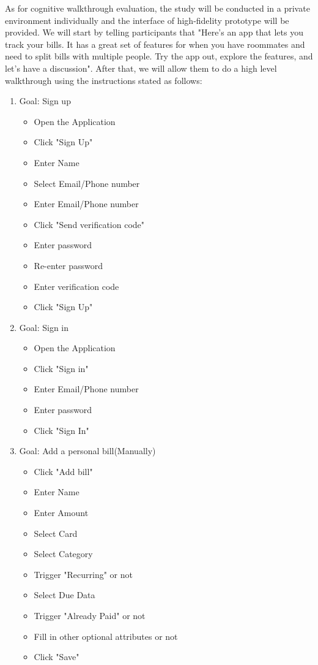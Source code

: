 \documentclass{sigchi}
\begin{document}
As for cognitive walkthrough evaluation, the study will be conducted in a private environment individually and the interface of  high-fidelity prototype will be provided. We will start by telling participants that "Here's an app that lets you track your bills. It has a great set of features for when you have roommates and need to split bills with multiple people. Try the app out, explore the features, and let's have a discussion". After that, we will allow them to do a high level walkthrough using the instructions stated as follows:
\begin{enumerate}
\item Goal: Sign up
    \begin{itemize}
        \item Open the Application
        \item Click "Sign Up"
        \item Enter Name
        \item Select Email/Phone number
        \item Enter Email/Phone number
        \item Click "Send verification code"
        \item Enter password
        \item Re-enter password
        \item Enter verification code
        \item Click "Sign Up"
    \end{itemize}
    
\item Goal: Sign in
    \begin{itemize}
        \item Open the Application
        \item Click "Sign in"
        \item Enter Email/Phone number
        \item Enter password
        \item Click "Sign In"
    \end{itemize}


\item Goal: Add a personal bill(Manually)
    \begin{itemize}
        \item Click "Add bill"
        \item Enter Name
        \item Enter Amount
        \item Select Card
        \item Select Category
        \item Trigger "Recurring" or not
        \item Select Due Data
        \item Trigger "Already Paid" or not
        \item Fill in other optional attributes or not
        \item Click "Save"
    \end{itemize}
    

\end{enumerate}
\end{document}
